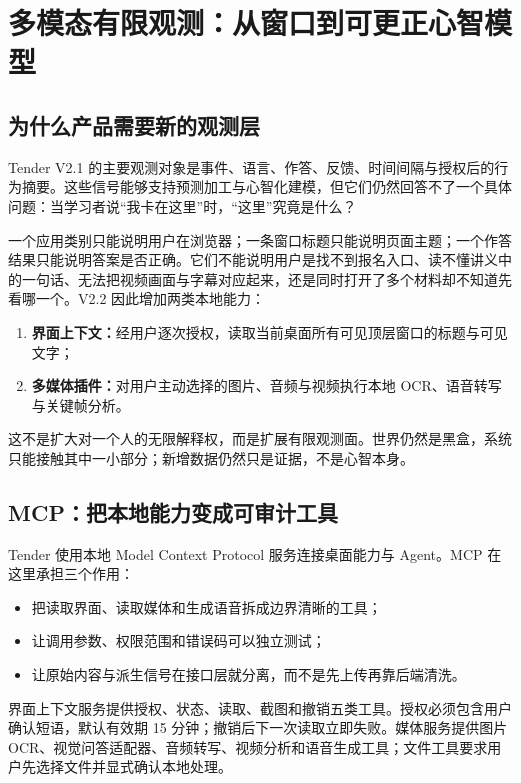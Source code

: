 \documentclass[UTF8,a4paper,11pt]{ctexart}
\begin{document}
\newpage
\section{多模态有限观测：从窗口到可更正心智模型}

\subsection{为什么产品需要新的观测层}

Tender V2.1 的主要观测对象是事件、语言、作答、反馈、时间间隔与授权后的行为摘要。这些信号能够支持预测加工与心智化建模，但它们仍然回答不了一个具体问题：当学习者说“我卡在这里”时，“这里”究竟是什么？

一个应用类别只能说明用户在浏览器；一条窗口标题只能说明页面主题；一个作答结果只能说明答案是否正确。它们不能说明用户是找不到报名入口、读不懂讲义中的一句话、无法把视频画面与字幕对应起来，还是同时打开了多个材料却不知道先看哪一个。V2.2 因此增加两类本地能力：

\begin{enumerate}
\item \textbf{界面上下文：}经用户逐次授权，读取当前桌面所有可见顶层窗口的标题与可见文字；
\item \textbf{多媒体插件：}对用户主动选择的图片、音频与视频执行本地 OCR、语音转写与关键帧分析。
\end{enumerate}

这不是扩大对一个人的无限解释权，而是扩展有限观测面。世界仍然是黑盒，系统只能接触其中一小部分；新增数据仍然只是证据，不是心智本身。

\subsection{MCP：把本地能力变成可审计工具}

Tender 使用本地 Model Context Protocol 服务连接桌面能力与 Agent。MCP 在这里承担三个作用：

\begin{itemize}
\item 把读取界面、读取媒体和生成语音拆成边界清晰的工具；
\item 让调用参数、权限范围和错误码可以独立测试；
\item 让原始内容与派生信号在接口层就分离，而不是先上传再靠后端清洗。
\end{itemize}

界面上下文服务提供授权、状态、读取、截图和撤销五类工具。授权必须包含用户确认短语，默认有效期 15 分钟；撤销后下一次读取立即失败。媒体服务提供图片 OCR、视觉问答适配器、音频转写、视频分析和语音生成工具；文件工具要求用户先选择文件并显式确认本地处理。
\end{document}
